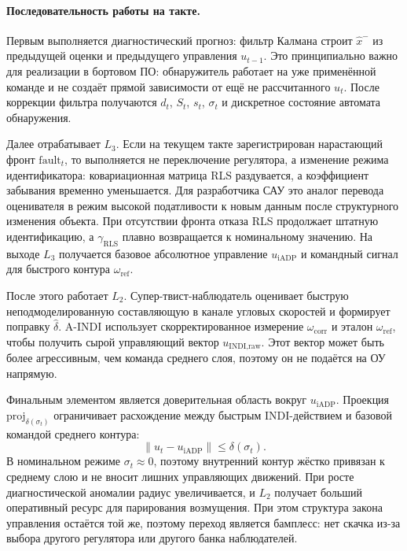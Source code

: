 \documentclass[a4paper,14pt]{extarticle}
\newcommand{\AINDI}{\textsc{A-INDI}}
\newcommand{\RLS}{\textsc{RLS}}
\begin{document}
\paragraph{Последовательность работы на такте.} Первым выполняется диагностический прогноз: фильтр Калмана строит $\hat x^{-}$ из предыдущей оценки и предыдущего управления $u_{t-1}$. Это принципиально важно для реализации в бортовом ПО: обнаружитель работает на уже применённой команде и не создаёт прямой зависимости от ещё не рассчитанного $u_t$. После коррекции фильтра получаются $d_t$, $S_t$, $s_t$, $\sigma_t$ и дискретное состояние автомата обнаружения.

Далее отрабатывает $L_3$. Если на текущем такте зарегистрирован нарастающий фронт $\text{fault}_t$, то выполняется не переключение регулятора, а изменение режима идентификатора: ковариационная матрица \RLS{} раздувается, а коэффициент забывания временно уменьшается. Для разработчика САУ это аналог перевода оценивателя в режим высокой податливости к новым данным после структурного изменения объекта. При отсутствии фронта отказа \RLS{} продолжает штатную идентификацию, а $\gamma_{\text{RLS}}$ плавно возвращается к номинальному значению. На выходе $L_3$ получается базовое абсолютное управление $u_{\text{iADP}}$ и командный сигнал для быстрого контура $\omega_{\text{ref}}$.

После этого работает $L_2$. Супер-твист-наблюдатель оценивает быструю неподмоделированную составляющую в канале угловых скоростей и формирует поправку $\hat\delta$. \AINDI{} использует скорректированное измерение $\omega_{\text{corr}}$ и эталон $\omega_{\text{ref}}$, чтобы получить сырой управляющий вектор $u_{\text{INDI,raw}}$. Этот вектор может быть более агрессивным, чем команда среднего слоя, поэтому он не подаётся на ОУ напрямую.

Финальным элементом является доверительная область вокруг $u_{\text{iADP}}$. Проекция $\mathrm{proj}_{\delta(\sigma_t)}$ ограничивает расхождение между быстрым INDI-действием и базовой командой среднего контура:
\[
\|u_t-u_{\text{iADP}}\| \leq \delta(\sigma_t).
\]
В номинальном режиме $\sigma_t\approx 0$, поэтому внутренний контур жёстко привязан к среднему слою и не вносит лишних управляющих движений. При росте диагностической аномалии радиус увеличивается, и $L_2$ получает больший оперативный ресурс для парирования возмущения. При этом структура закона управления остаётся той же, поэтому переход является бамплесс: нет скачка из-за выбора другого регулятора или другого банка наблюдателей.
\end{document}
